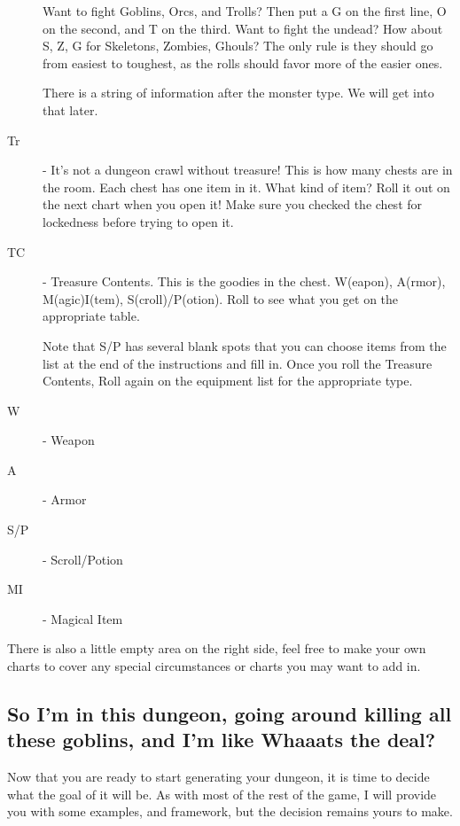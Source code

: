 \documentclass[a6paper,hidelinks]{article}
\makeatletter
\def\namedlabel#1#2{\begingroup
    #2%
    \def\@currentlabel{#2}%
    \phantomsection\label{#1}\endgroup
}
\makeatother
\begin{document}
\begin{description}
Want to fight Goblins, Orcs, and Trolls?  Then put a G on the first line, O on the second, and T on the third. Want to fight the undead? How about S, Z, G for Skeletons, Zombies, Ghouls? The only rule is they should go from easiest to toughest, as the rolls should favor more of the easier ones.

There is a string of information after the monster type. We will get into that later.

\item[\namedlabel{itm:srt_Tr}{Tr}] - It's not a dungeon crawl without treasure! This is how many chests are in the room. Each chest has one item in it. What kind of item? Roll it out on the next chart when you open it! Make sure you checked the chest for lockedness before trying to open it.

\item[\namedlabel{itm:srt_TC}{TC}] - Treasure Contents. This is the goodies in the chest. W(eapon), A(rmor), M(agic)I(tem), S(croll)/P(otion). Roll to see what you get on the appropriate table.

Note that S/P has several blank spots that you can choose items from the list at the end of the instructions and fill in. Once you roll the Treasure Contents, Roll again on the equipment list for the appropriate type.

\item[\namedlabel{itm:srt_W}{W}] - Weapon

\item[\namedlabel{itm:srt_A}{A}] - Armor 

\item[\namedlabel{itm:srt_SP}{S/P}] - Scroll/Potion

\item[\namedlabel{itm:srt_MI}{MI}] - Magical Item

\end{description}

There is also a little empty area on the right side, feel free to make your own charts to cover any special circumstances or charts you may want to add in.

\subsection{So I'm in this dungeon, going around killing all these goblins, and I’m like Whaaats the deal?}
Now that you are ready to start generating your dungeon, it is time to decide what the goal of it will be. As with most of the rest of the game, I will provide you with some examples, and framework, but the decision remains yours to make.
\end{document}
